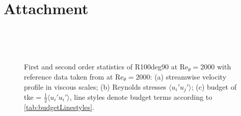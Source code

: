 \chapter{Attachment} \label{chap:attachment}


\begin{figure}[h!]
\centering
\begin{subfigure}[t]{0.495\textwidth}
    \subcaption{}
    \centering
    
    \label{fig:R100deg90_U}
\end{subfigure}
\hfill
\begin{subfigure}[t]{0.495\textwidth}
    \centering
    \subcaption{}
    
    \label{fig:R100deg90_fluct}
\end{subfigure}
\\[-20pt]
\begin{subfigure}[t]{0.495\textwidth}
    \centering
    \subcaption{}
    
    \label{fig:R100deg90_bud}
\end{subfigure}
\\[-15pt]
\caption[First and second order statistics of R100deg90 at $\mathrm{Re}_{\theta} = 2000$ with reference data taken from \citet{schlatter_assessment_2010} at $\mathrm{Re}_{\theta} = 2000$, and streamwise boundary layer thickness development normalised with reference boundary layer thickness $\delta_0$]{First and second order statistics of R100deg90 at $\mathrm{Re}_{\theta} = 2000$ with reference data taken from \citet{schlatter_assessment_2010} at $\mathrm{Re}_{\theta} = 2000$: (a) streamwise velocity profile in viscous scales; (b) Reynolds stresses $\langle u_i' u_j' \rangle$; (c) budget of \acrshort{tke} = $\frac{1}{2} \langle u_i' u_i' \rangle$, line styles denote budget terms according to \autoref{tab:budgetLinestyles}.}
\label{fig:R100deg90_stats}
\end{figure}

